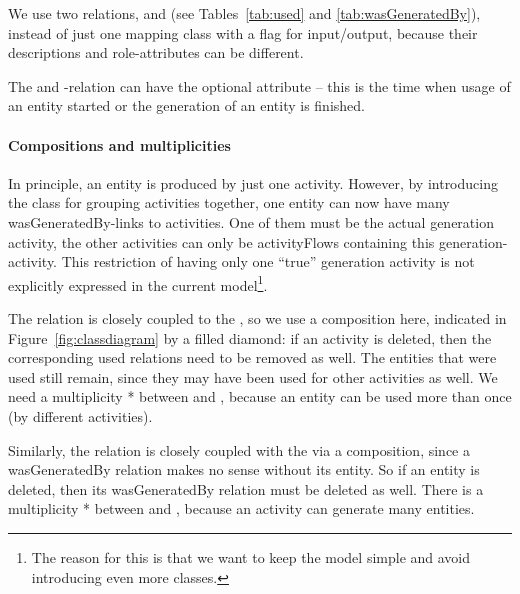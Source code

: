 We use two relations,  and  (see Tables~\ref{tab:used} and \ref{tab:wasGeneratedBy}), instead of just one
mapping class with a flag for input/output, because their descriptions and role-attributes
can be different. 

The  and -relation can have the optional
attribute  -- this is the time when usage of an entity started
or the generation of an entity is finished.

\paragraph{Compositions and multiplicities}
In principle, an entity is produced by just one activity.
However, by introducing the  class for grouping activities together, 
one entity can now have many wasGeneratedBy-links to activities. One of them must 
be the actual generation activity, the other activities can only be activityFlows 
containing this generation-activity. This restriction of having only one ``true'' generation activity is not explicitly expressed in the current model\footnote{The reason for this is that we want to keep the model simple and avoid introducing even more classes.}.


The  relation is closely coupled to the , so we use a composition here, indicated
in Figure~\ref{fig:classdiagram} by a filled diamond: 
if an activity is deleted, then the corresponding used relations need to be removed as well. 
The entities that were used still remain, since they may have been used for other activities as well.
We need a multiplicity * between  and , because an entity can be used more than once
(by different activities).

Similarly, the  relation is closely coupled with the  via a composition,
since a wasGeneratedBy relation makes no sense without its entity. So if an entity is deleted, 
then its wasGeneratedBy relation must be deleted as well. There is a multiplicity * between 
and , because an activity can generate many entities.

